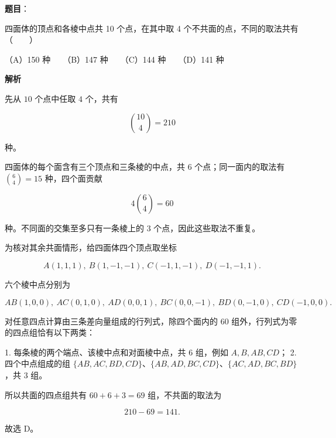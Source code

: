 \begin{answer}

\textbf{题目}：

四面体的顶点和各棱中点共 10 个点，在其中取 4 个不共面的点，不同的取法共有\mbox{（　　）}

（A）150 种　　（B）147 种　　（C）144 种　　（D）141 种

\textbf{解析}

先从 $10$ 个点中任取 $4$ 个，共有

\nopagebreak[4]
\[
\binom{10}{4}=210
\]

种。

四面体的每个面含有三个顶点和三条棱的中点，共 $6$ 个点；同一面内的取法有 $\binom64=15$ 种，四个面贡献

\nopagebreak[4]
\[
4\binom64=60
\]

种。不同面的交集至多只有一条棱上的 $3$ 个点，因此这些取法不重复。

为核对其余共面情形，给四面体四个顶点取坐标

\nopagebreak[4]
\[
A(1,1,1),\ B(1,-1,-1),\ C(-1,1,-1),\ D(-1,-1,1).
\]

六个棱中点分别为

\nopagebreak[4]
\[
AB(1,0,0),\ AC(0,1,0),\ AD(0,0,1),\ BC(0,0,-1),\ BD(0,-1,0),\ CD(-1,0,0).
\]

对任意四点计算由三条差向量组成的行列式，除四个面内的 $60$ 组外，行列式为零的四点组恰有以下两类：

1. 每条棱的两个端点、该棱中点和对面棱中点，共 $6$ 组，例如 $A,B,AB,CD$；
2. 四个中点组成的组 $\{AB,AC,BD,CD\}$、$\{AB,AD,BC,CD\}$、$\{AC,AD,BC,BD\}$，共 $3$ 组。

所以共面的四点组共有 $60+6+3=69$ 组，不共面的取法为

\nopagebreak[4]
\[
210-69=141.
\]

故选 D。


\end{answer}
